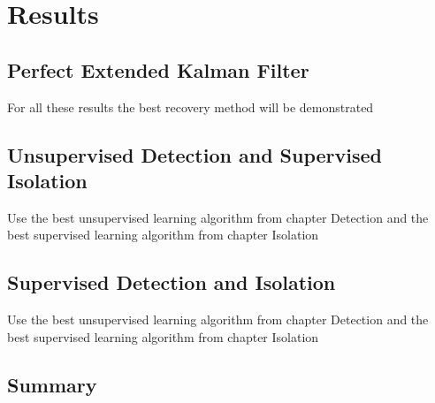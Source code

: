 \chapter{Results}
\label{chap:Results}


\section{Perfect Extended Kalman Filter}
For all these results the best recovery method will be demonstrated

\section{Unsupervised Detection and Supervised Isolation}
Use the best unsupervised learning algorithm from chapter Detection and the best supervised learning algorithm from chapter Isolation

\section{Supervised Detection and Isolation}
Use the best unsupervised learning algorithm from chapter Detection and the best supervised learning algorithm from chapter Isolation

\section{Summary}